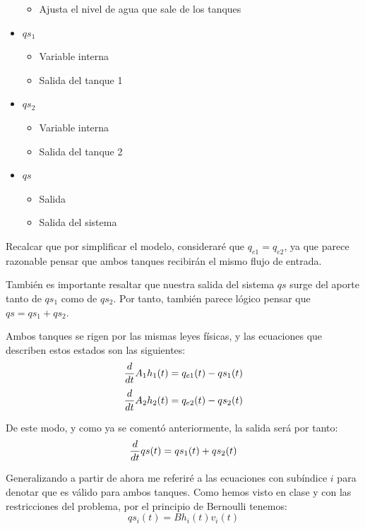 \documentclass[12pt]{article}
\begin{document}
\begin{itemize}
\begin{itemize}
        \item Ajusta el nivel de agua que sale de los tanques
    \end{itemize}
    \item $qs_1$
    \begin{itemize}
        \item Variable interna
        \item Salida del tanque 1
    \end{itemize}
    \item $qs_2$
    \begin{itemize}
        \item Variable interna
        \item Salida del tanque 2
    \end{itemize}
    \item $qs$
    \begin{itemize}
        \item Salida
        \item Salida del sistema
    \end{itemize}
\end{itemize}
Recalcar que por simplificar el modelo, consideraré que $q_{e1} = q_{e2}$, ya que parece razonable
pensar que ambos tanques recibirán el mismo flujo de entrada.

También es importante resaltar que nuestra salida del sistema $qs$ surge del aporte tanto de $qs_1$
como de $qs_2$. Por tanto, también parece lógico pensar que $qs = qs_1 + qs_2$.

Ambos tanques se rigen por las mismas leyes físicas, y las ecuaciones que describen estos estados son las
siguientes:
\begin{equation}
    \label{eq:tanque1}
    {d \over dt} A_1 h_1(t) = q_{e1}(t) - qs_1(t)
\end{equation}
\begin{equation}
    \label{eq:tanque2}
    {d \over dt} A_2 h_2(t) = q_{e2}(t) - qs_2(t)
\end{equation}

De este modo, y como ya se comentó anteriormente, la salida será por tanto:
\begin{equation}
    \label{eq:salida}
    {d \over dt} qs(t) = qs_1(t) + qs_2(t)
\end{equation}

Generalizando a partir de ahora me referiré a las ecuaciones con subíndice $i$ para denotar que es
válido para ambos tanques. Como hemos visto en clase y con las restricciones del problema, por el
principio de Bernoulli tenemos:
\begin{equation}
    \label{eq:bernoulliqt}
    {qs_i(t) = B h_i(t) v_i(t)}
\end{equation}
\end{document}
